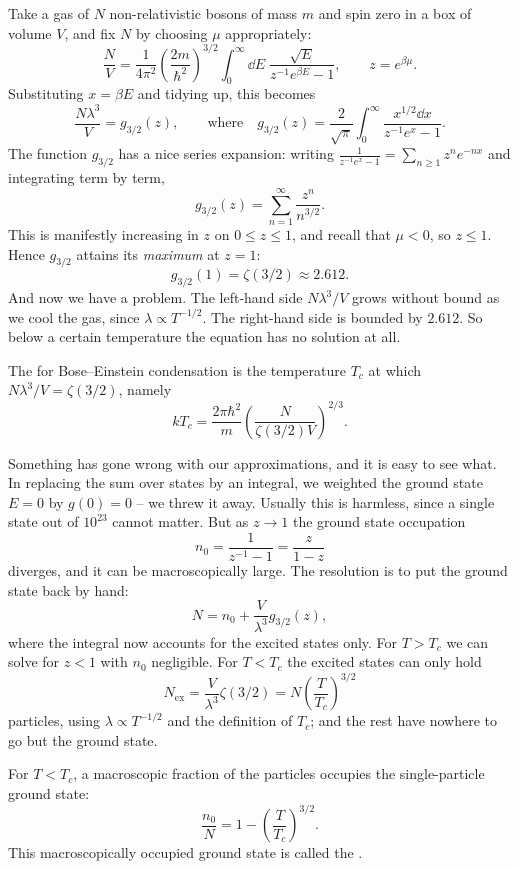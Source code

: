 \documentclass[a4paper]{scrartcl}
\begin{document}
Take a gas of $N$ non-relativistic bosons of mass $m$ and spin zero in a box of volume $V$, and fix $N$ by choosing $\mu$ appropriately:
$$
\frac NV = \frac{1}{4\pi^2}\left(\frac{2m}{\hbar^2}\right)^{3/2}\int_0^\infty \dd E\; \frac{\sqrt E}{z^{-1}e^{\beta E}-1}, \qquad z = e^{\beta\mu}.
$$
Substituting $x = \beta E$ and tidying up, this becomes
$$
\frac{N\lambda^3}{V} = g_{3/2}(z), \qquad \text{where} \quad g_{3/2}(z) = \frac{2}{\sqrt\pi}\int_0^\infty \frac{x^{1/2}\dd x}{z^{-1}e^x - 1}.
$$
The function $g_{3/2}$ has a nice series expansion: writing $\frac{1}{z^{-1}e^x-1} = \sum_{n\ge 1}z^n e^{-nx}$ and integrating term by term,
$$
g_{3/2}(z) = \sum_{n=1}^\infty \frac{z^n}{n^{3/2}}.
$$
This is manifestly increasing in $z$ on $0 \le z \le 1$, and recall that $\mu < 0$, so $z \le 1$. Hence $g_{3/2}$ attains its \emph{maximum} at $z = 1$:
$$
g_{3/2}(1) = \zeta(3/2) \approx 2.612.
$$
And now we have a problem. The left-hand side $N\lambda^3/V$ grows without bound as we cool the gas, since $\lambda \propto T^{-1/2}$. The right-hand side is bounded by $2.612$. So below a certain temperature the equation has no solution at all.

\begin{definition}
	The  for Bose--Einstein condensation is the temperature $T_c$ at which $N\lambda^3/V = \zeta(3/2)$, namely
	$$
	kT_c = \frac{2\pi\hbar^2}{m}\left(\frac{N}{\zeta(3/2)V}\right)^{2/3}.
	$$
\end{definition}

Something has gone wrong with our approximations, and it is easy to see what. In replacing the sum over states by an integral, we weighted the ground state $E=0$ by $g(0) = 0$ -- we threw it away. Usually this is harmless, since a single state out of $10^{23}$ cannot matter. But as $z \to 1$ the ground state occupation
$$
n_0 = \frac{1}{z^{-1}-1} = \frac{z}{1-z}
$$
diverges, and it can be macroscopically large. The resolution is to put the ground state back by hand:
$$
N = n_0 + \frac{V}{\lambda^3}g_{3/2}(z),
$$
where the integral now accounts for the excited states only. For $T > T_c$ we can solve for $z < 1$ with $n_0$ negligible. For $T < T_c$ the excited states can only hold
$$
N_{\mathrm{ex}} = \frac{V}{\lambda^3}\zeta(3/2) = N\left(\frac{T}{T_c}\right)^{3/2}
$$
particles, using $\lambda \propto T^{-1/2}$ and the definition of $T_c$; and the rest have nowhere to go but the ground state.

\begin{proposition}
	For $T < T_c$, a macroscopic fraction of the particles occupies the single-particle ground state:
	$$
	\frac{n_0}{N} = 1 - \left(\frac{T}{T_c}\right)^{3/2}.
	$$
	This macroscopically occupied ground state is called the .
\end{proposition}
\end{document}
